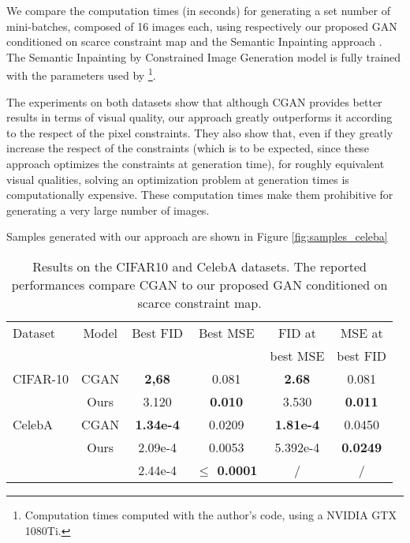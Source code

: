  We compare the computation times (in seconds) for generating a set number of mini-batches, composed of 16 images each, using respectively our proposed GAN conditioned on scarce constraint map and the Semantic Inpainting approach \citep{Yeh2017}. The  Semantic Inpainting by Constrained Image Generation model is fully trained with the parameters used by \citet{Yeh2017} \footnote{Computation times computed with the author's code, using a NVIDIA GTX 1080Ti. }.
 
 The experiments on both datasets show that although CGAN  provides better results in terms of visual quality, our approach greatly outperforms it according to the respect of the pixel constraints. They also show that, even if they greatly increase the respect of the constraints (which is to be expected, since these approach optimizes the constraints at generation time), for roughly equivalent visual qualities, solving an optimization problem at generation times is computationally expensive. These computation times make them prohibitive for generating a very large number of images.
 
  Samples generated with our approach are shown in Figure \ref{fig:samples_celeba}

\begin{table}[t]
	\centering
	\begin{tabular}{l c c c c c }
		\Bigrule
		Dataset &Model           & Best \ac{FID} & Best \ac{MSE} & \ac{FID} at & \ac{MSE} at \\
		&&&&best \ac{MSE} & best \ac{FID} \\
		\bigrule
		CIFAR-10 &CGAN   & \textbf{2,68}  & 0.081  & \textbf{2.68}  & 0.081\\
		&Ours            & 3.120 & \textbf{0.010} & 3.530 & \textbf{0.011} \\    
		\bigrule
		CelebA &CGAN      & \textbf{1.34e-4} & 0.0209 &  \textbf{1.81e-4} & 0.0450\\
		&Ours            & 2.09e-4& 0.0053 & 5.392e-4 & \textbf{0.0249} \\
		&\citet{Yeh2017} & 2.44e-4& \textbf{$\leq$ 0.0001} & / & / \\
	\end{tabular}
	
	\caption[Results on the CIFAR10 and CelebA datasets]{Results on the CIFAR10 and CelebA datasets. The reported performances compare CGAN to our proposed GAN conditioned on scarce constraint map.}
	\label{tab:cifar10}
\end{table}

